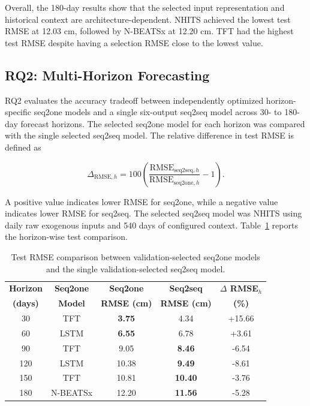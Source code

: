 \documentclass[conference]{IEEEtran}
\begin{document}
Overall, the 180-day results show that the selected input representation and historical context are architecture-dependent. NHITS achieved the lowest test RMSE at 12.03 cm, followed by N-BEATSx at 12.20 cm. TFT had the highest test RMSE despite having a selection RMSE close to the lowest value.


\subsection{RQ2: Multi-Horizon Forecasting}

RQ2 evaluates the accuracy tradeoff between independently optimized horizon-specific seq2one models and a single six-output seq2seq model across 30- to 180-day forecast horizons. The selected seq2one model for each horizon was compared with the single selected seq2seq model. The relative difference in test RMSE is defined as

\[
    \Delta_{\mathrm{RMSE},h} =
    100\left(
    \frac{\mathrm{RMSE}_{\mathrm{seq2seq},h}}
    {\mathrm{RMSE}_{\mathrm{seq2one},h}}
    -1
    \right).
\]

A positive value indicates lower RMSE for seq2one, while a negative value indicates lower RMSE for seq2seq. The selected seq2seq model was NHITS using daily raw exogenous inputs and 540 days of configured context. Table~\ref{tab:rq2_multihorizon} reports the horizon-wise test comparison.

\begin{table}[htbp]
\centering
\caption{Test RMSE comparison between validation-selected seq2one models and the single validation-selected seq2seq model.}
\label{tab:rq2_multihorizon}
\small
\setlength{\tabcolsep}{4pt}
    \begin{tabular}{@{}ccccc@{}}
    \hline
    \textbf{Horizon} &
    \textbf{Seq2one} &
    \textbf{Seq2one} &
    \textbf{Seq2seq} &
    \textbf{$\Delta$ RMSE$_h$} \\
    \textbf{(days)} &
    \textbf{Model} &
    \textbf{RMSE (cm)} &
    \textbf{RMSE (cm)} &
    \textbf{(\%)} \\
    \hline
    30  & TFT       & \textbf{3.75} & 4.34 & +15.66 \\
    60  & LSTM      & \textbf{6.55} & 6.78 & +3.61  \\
    90  & TFT       & 9.05 & \textbf{8.46} & -6.54  \\
    120 & LSTM      & 10.38 & \textbf{9.49} & -8.61 \\
    150 & TFT       & 10.81 & \textbf{10.40} & -3.76 \\
    180 & N-BEATSx  & 12.20 & \textbf{11.56} & -5.28 \\
    \hline
    \end{tabular}
\end{table}
\end{document}
